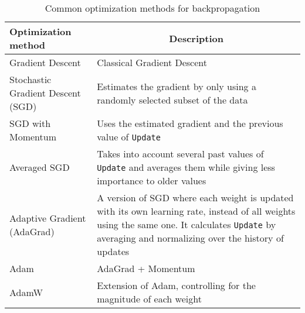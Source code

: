 \begin{table}%
    \centering
    \begin{tabular}{p{}|p{}}
        \textbf{Optimization method} &  \multicolumn{1}{c}{\textbf{Description}} \\ \hline
        Gradient Descent &  Classical Gradient Descent\\
        Stochastic Gradient Descent (SGD) & Estimates the gradient by only using a randomly selected subset of the data \\
        SGD with Momentum & Uses the estimated gradient and the previous value of \texttt{Update}\\
        Averaged SGD &  Takes into account several past values of \texttt{Update} and averages them while giving less importance to older values \\
        Adaptive Gradient (AdaGrad) & A version of SGD where each weight is updated with its own learning rate, instead of all weights using the same one. It calculates \texttt{Update} by averaging and normalizing over the history of updates \\
        Adam & AdaGrad + Momentum \\
        AdamW & Extension of Adam, controlling for the magnitude of each weight \\
    \end{tabular}
    \caption{Common optimization methods for backpropagation}
    \label{tab:02_nn_common_optimizers}
\end{table}
